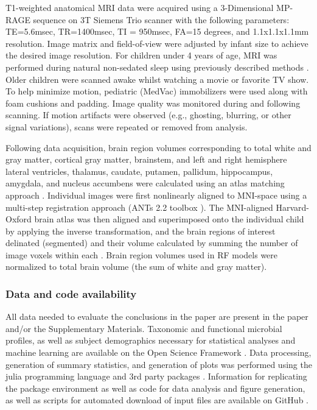 \documentclass{article}
\begin{document}
T1-weighted anatomical MRI data were acquired using a 3-Dimensional MP-RAGE sequence
on 3T Siemens Trio scanner with the following parameters:
TE=5.6msec, TR=1400msec, TI = 950msec, FA=15 degrees, and 1.1x1.1x1.1mm resolution.
Image matrix and field-of-view were adjusted by infant size to achieve the desired image resolution.
For children under 4 years of age, MRI was performed during natural non-sedated sleep using previously described methods \cite{deanPediatricNeuroimagingUsing2014}.
Older children were scanned awake whilst watching a movie or favorite TV show.
To help minimize motion, pediatric (MedVac) immobilizers were used along with foam cushions and padding.
Image quality was monitored during and following scanning.
If motion artifacts were observed (e.g., ghosting, blurring, or other signal variations),
scans were repeated or removed from analysis.

Following data acquisition, brain region volumes corresponding to total white and gray matter,
cortical gray matter, brainstem, and left and right hemisphere lateral ventricles,
thalamus, caudate, putamen, pallidum, hippocampus, amygdala,
and nucleus accumbens were calculated using an atlas matching approach \cite{bruchhageLongitudinalBrainCognitive}.
Individual images were first nonlinearly aligned to MNI-space using
a multi-step registration approach (ANTs 2.2 toolbox \cite{avantsInsightToolKitImage2014}).
The MNI-aligned Harvard-Oxford brain atlas was then aligned and superimposed onto the individual child
by applying the inverse transformation, and the brain regions of interest delinated (segmented)
and their volume calculated by summing the number of image voxels within each \cite{jenkinsonFSL2012}.
Brain region volumes used in RF models were normalized to total brain volume
(the sum of white and gray matter).

\subsubsection*{Data and code availability}

All data needed to evaluate the conclusions in the paper
are present in the paper and/or the Supplementary Materials.
Taxonomic and functional microbial profiles, as well as subject
demographics necessary for statistical analyses and machine learning are
available on the Open Science Framework
\cite{bonhamECHORESONANCEMicrobiome2022}.
Data processing, generation of summary statistics, and
generation of plots was performed using the julia programming language
and 3rd party packages
\cite{bezansonJuliaFreshApproach2017,
    bonhamMicrobiomeJlBiobakeryUtils2021,
    danischMakieJlFlexible2021,
    blaomMLJJuliaPackage2020,
    ben_sadeghi_2022_7359268,
    dahua_lin_2023_7695673,
    douglas_bates_2023_7734970}.
Information for replicating the package environment
as well as code for data analysis and figure generation, as well as scripts for automated
download of input files are available on GitHub \cite{kevin_bonham_2023_7647510}.
\end{document}
